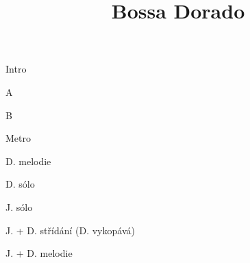 \documentclass[timestamp]{jazzgrid}
\title{Bossa Dorado}
\begin{document}
\maketitle
\begin{musicsection}{Intro}
\barline
	{}
	{}
	{}
	{}
\barline
	{}
	{}
	{}
	{}
\end{musicsection}

\begin{musicsection}{A}
\barline
	{}
	{\barfour{}{}{}{}{}}
	{}
	{\barfour{}{}{}{}{}}
\barline
	{}
	{}
	{}
	{}
	{}
	{\barfour{}{}{}{}{}}
\end{musicsection}

\begin{musicsection}{B}
\barline
	{}
	{}
	{}
	{\barfour{}{}{}{}{}}
\barline
	{}
	{\barfour{}{}{}{}{}}
	{}
	{}
\end{musicsection}

\begin{musicsection}{Metro}
	{}
	{}
\end{musicsection}


\begin{multicols*}{2}
\begin{description}[noitemsep,align=right,labelwidth=\widthof{\scriptsize\bfseries{AABA}}]
	\scriptsize
	\item [Intro]
	\item [AABA] D. melodie
	\item [AABA] D. sólo
	\item [AABA] J. sólo
	\item [Metro]
	\item [AA\phantom{BA}] J. + D. střídání (D. vykopává)
	\item [\phantom{AA}BA] J. + D. melodie

\end{description}
\end{multicols*}
\end{document}
